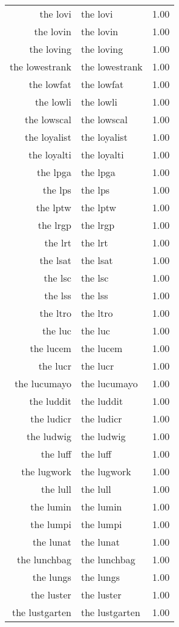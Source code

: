\begin{table}[ht]
\begin{tabular}{rlr}
  the lovi & the lovi & 1.00 \\ 
  the lovin & the lovin & 1.00 \\ 
  the loving & the loving & 1.00 \\ 
  the lowestrank & the lowestrank & 1.00 \\ 
  the lowfat & the lowfat & 1.00 \\ 
  the lowli & the lowli & 1.00 \\ 
  the lowscal & the lowscal & 1.00 \\ 
  the loyalist & the loyalist & 1.00 \\ 
  the loyalti & the loyalti & 1.00 \\ 
  the lpga & the lpga & 1.00 \\ 
  the lps & the lps & 1.00 \\ 
  the lptw & the lptw & 1.00 \\ 
  the lrgp & the lrgp & 1.00 \\ 
  the lrt & the lrt & 1.00 \\ 
  the lsat & the lsat & 1.00 \\ 
  the lsc & the lsc & 1.00 \\ 
  the lss & the lss & 1.00 \\ 
  the ltro & the ltro & 1.00 \\ 
  the luc & the luc & 1.00 \\ 
  the lucem & the lucem & 1.00 \\ 
  the lucr & the lucr & 1.00 \\ 
  the lucumayo & the lucumayo & 1.00 \\ 
  the luddit & the luddit & 1.00 \\ 
  the ludicr & the ludicr & 1.00 \\ 
  the ludwig & the ludwig & 1.00 \\ 
  the luff & the luff & 1.00 \\ 
  the lugwork & the lugwork & 1.00 \\ 
  the lull & the lull & 1.00 \\ 
  the lumin & the lumin & 1.00 \\ 
  the lumpi & the lumpi & 1.00 \\ 
  the lunat & the lunat & 1.00 \\ 
  the lunchbag & the lunchbag & 1.00 \\ 
  the lungs & the lungs & 1.00 \\ 
  the luster & the luster & 1.00 \\ 
  the lustgarten & the lustgarten & 1.00 \\ 

\end{tabular}
\end{table}
